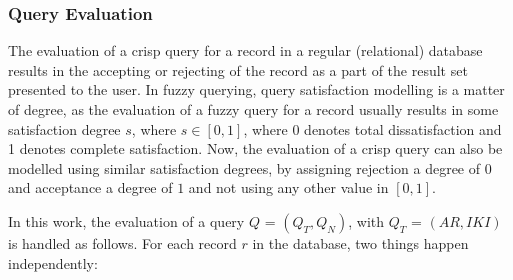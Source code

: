 






\vspace{-20pt}
\subsubsection{Query Evaluation}
The evaluation of a crisp query for a record in a regular (relational) database results in the accepting or rejecting of the record as a part of the result set presented to the user. In fuzzy querying, query satisfaction modelling is a matter of degree, as the evaluation of a fuzzy query for a record usually results in some satisfaction degree $s$, where $s \in \left[0,1\right]$, where 0 denotes total dissatisfaction and 1 denotes complete satisfaction. Now, the evaluation of a crisp query can also be modelled using similar satisfaction degrees, by assigning rejection a degree of $0$ and acceptance a degree of $1$ and not using any other value in $\left[0,1\right]$.

In this work, the evaluation of a query $Q$ = $(Q_{T}, Q_{N})$, with $Q_{T}$ = $(AR, IKI)$ is handled as follows. For each record $r$ in the database, two things happen independently:


